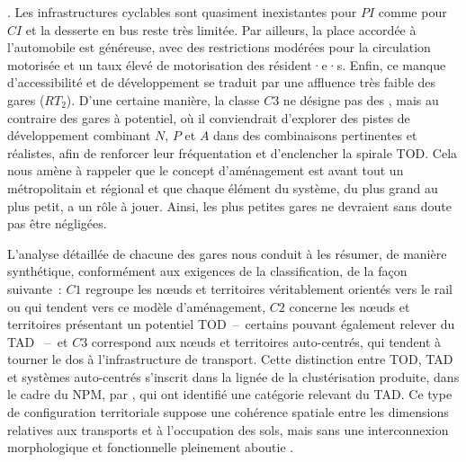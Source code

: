 \begin{refsegment}
{}. Les infrastructures cyclables sont quasiment inexistantes pour \(PI\) comme pour \(CI\) et la desserte en bus reste très limitée. Par ailleurs, la place accordée à l’automobile est généreuse, avec des restrictions modérées pour la circulation motorisée et un taux élevé de motorisation des résident·e·s. Enfin, ce manque d’accessibilité et de développement se traduit par une affluence très faible des gares (\(RT_{2}\)). D'une certaine manière, la classe \(C3\) ne désigne pas des , mais au contraire des gares à potentiel, où il conviendrait d'explorer des pistes de développement combinant \(N\), \(P\) et \(A\) dans des combinaisons pertinentes et réalistes, afin de renforcer leur fréquentation et d'enclencher la spirale \acrshort{TOD}. Cela nous amène à rappeler que le concept d'aménagement est avant tout un  métropolitain et régional et que chaque élément du système, du plus grand au plus petit, a un rôle à jouer. Ainsi, les plus petites gares ne devraient sans doute pas être négligées.%

L’analyse détaillée de chacune des gares nous conduit à les résumer, de manière synthétique, conformément aux exigences de la classification, de la façon suivante~: \(C1\) regroupe les nœuds et territoires véritablement orientés vers le rail ou qui tendent vers ce modèle d'aménagement, \(C2\) concerne les nœuds et territoires présentant un potentiel \acrshort{TOD}~–~certains pouvant également relever du \acrshort{TAD} \textcolor{blue}{\autocite[3]{renne_transit-adjacent_2009}}~–~et \(C3\) correspond aux nœuds et territoires auto-centrés, qui tendent à tourner le dos à l’infrastructure de transport. Cette distinction entre \acrshort{TOD}, \acrshort{TAD} et systèmes auto-centrés s’inscrit dans la lignée de la clustérisation produite, dans le cadre du \acrshort{NPM}, par \textcolor{blue}{\textcite[271]{li_transit_2019}}, qui ont identifié une catégorie relevant du \acrshort{TAD}. Ce type de configuration territoriale suppose une cohérence spatiale entre les dimensions relatives aux transports et à l’occupation des sols, mais sans une interconnexion morphologique et fonctionnelle pleinement aboutie \textcolor{blue}{\autocite[47]{el_hadeuf_ville_2017}}.%


\end{refsegment}
